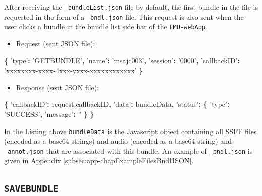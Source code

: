 \documentclass[]{book}
\newenvironment{Shaded}{\begin{snugshade}}{\end{snugshade}}
\newcommand{\AttributeTok}[1]{\textcolor[rgb]{0.77,0.63,0.00}{#1}}
\newcommand{\NormalTok}[1]{#1}
\newcommand{\OperatorTok}[1]{\textcolor[rgb]{0.81,0.36,0.00}{\textbf{#1}}}
\newcommand{\StringTok}[1]{\textcolor[rgb]{0.31,0.60,0.02}{#1}}
\newcommand{\VariableTok}[1]{\textcolor[rgb]{0.00,0.00,0.00}{#1}}
\providecommand{\tightlist}{%
  \setlength{\itemsep}{0pt}\setlength{\parskip}{0pt}}
\theoremstyle{definition}
\theoremstyle{definition}
\theoremstyle{definition}
\theoremstyle{remark}
\begin{document}
After receiving the \texttt{\_bundleList.json} file by default, the
first bundle in the file is requested in the form of a
\texttt{\_bndl.json} file. This request is also sent when the user
clicks a bundle in the bundle list side bar of the \texttt{EMU-webApp}.

\begin{itemize}
\tightlist
\item
  Request (sent JSON file):
\end{itemize}

\begin{Shaded}
\begin{Highlighting}[]
\OperatorTok{\{}
  \StringTok{'type'}\OperatorTok{:} \StringTok{'GETBUNDLE'}\OperatorTok{,}
  \StringTok{'name'}\OperatorTok{:} \StringTok{'msajc003'}\OperatorTok{,}
  \StringTok{'session'}\OperatorTok{:} \StringTok{'0000'}\OperatorTok{,}
  \StringTok{'callbackID'}\OperatorTok{:} \StringTok{'xxxxxxxx-xxxx-4xxx-yxxx-xxxxxxxxxxxx'}
\OperatorTok{\}}
\end{Highlighting}
\end{Shaded}

\begin{itemize}
\tightlist
\item
  Response (sent JSON file):
\end{itemize}

\begin{Shaded}
\begin{Highlighting}[]
\OperatorTok{\{}
  \StringTok{'callbackID'}\OperatorTok{:} \VariableTok{request}\NormalTok{.}\AttributeTok{callbackID}\OperatorTok{,}
  \StringTok{'data'}\OperatorTok{:}\NormalTok{ bundleData}\OperatorTok{,}
  \StringTok{'status'}\OperatorTok{:} \OperatorTok{\{}
    \StringTok{'type'}\OperatorTok{:} \StringTok{'SUCCESS'}\OperatorTok{,}
    \StringTok{'message'}\OperatorTok{:} \StringTok{''}
  \OperatorTok{\}}
\OperatorTok{\}}
\end{Highlighting}
\end{Shaded}

In the Listing above \texttt{bundleData} is the Javascript object
containing all SSFF files (encoded as a base64 strings) and audio
(encoded as a base64 string) and \texttt{\_annot.json} that are
associated with this bundle. An example of \texttt{\_bndl.json} is given
in Appendix \ref{subsec:app-chapExampleFilesBndlJSON}.

\hypertarget{savebundle}{%
\subsection{\texorpdfstring{\texttt{SAVEBUNDLE}}{SAVEBUNDLE}}\label{savebundle}}
\end{document}
